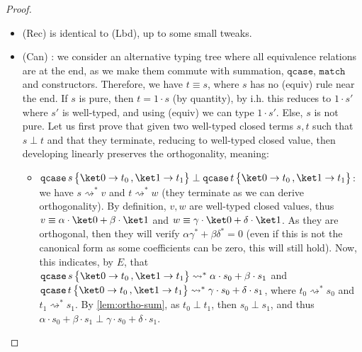\documentclass[10pt,a4paper]{article}
\newcommand{\textqcase}{\ensuremath{\mathtt{qcase}}}
\newcommand{\textmatch}{\ensuremath{\mathtt{match}}}
\newcommand{\zket}{\ket 0}
\newcommand{\oket}{\ket 1}
\newcommand{\qcasebase}[2]{
  \textqcase\,#1\left\{\! \begin{aligned} #2 \end{aligned}\right\}
}
\newcommand{\qcase}[3]{
  \qcasebase {#1} {\zket \to #2\,, \oket \to #3}
}
\newcommand{\reduces}{\rightsquigarrow}
\newcommand{\sreduces}{\reduces^*}
\newcommand{\evalcontext}{\ensuremath{E}}
\begin{document}
\begin{proof}
\begin{itemize}
    \item (Rec) is identical to (Lbd), up to some small tweaks.

    \item (Can) : we consider an alternative typing tree where all
      equivalence relations are at the end, as we make them commute
      with summation, \textqcase{}, \textmatch{} and constructors.
      Therefore, we have $t \equiv s$, where $s$ has no (equiv) rule
      near the end.
      If $s$ is pure, then $t = 1 \cdot s$ (by quantity), by i.h.
      this reduces to
      $1 \cdot s'$ where $s'$ is well-typed, and using (equiv) we can
      type $1 \cdot s'$.
      Else, $s$ is not pure.
      Let us first prove that given two well-typed closed terms $s, t$
      such that $s \perp t$ and that they terminate, reducing to well-typed
      closed value,
      then developing linearly preserves the
      orthogonality, meaning:

      \begin{itemize}

        \item $\qcase s {t_0} {t_1} \perp \qcase t {t_0}
          {t_1}$: we have $s \sreduces v$ and $t \sreduces w$ (they
          terminate as we can derive orthogonality).
          By definition, $v, w$ are well-typed closed values,
          thus $v \equiv \alpha \cdot \zket + \beta \cdot
          \oket$ and $w \equiv \gamma \cdot \zket + \delta \cdot \oket$.
          As they are orthogonal, then they will verify $\alpha
          \gamma^* + \beta \delta^* = 0$ (even if this is not the
            canonical form as some coefficients can be zero, this will
          still hold).
          Now, this indicates, by \evalcontext, that $\qcase s
          {t_0} {t_1} \sreduces \alpha \cdot s_0 + \beta \cdot s_1$
          and $\qcase t {t_0} {t_1} \sreduces \gamma \cdot s_0 +
          \delta \cdot s_1$, where $t_0 \sreduces s_0$ and $t_1 \sreduces s_1$.
          By \autoref{lem:ortho-sum}, as $t_0 \perp t_1$, then
          $s_0 \perp s_1$, and thus
          $\alpha \cdot s_0 + \beta \cdot s_1 \perp\gamma \cdot s_0 +
          \delta \cdot s_1$.


\end{itemize}
\end{itemize}
\end{proof}
\end{document}
